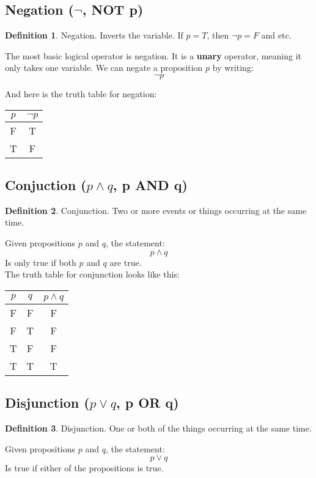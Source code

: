 \documentclass{article}
\theoremstyle{definition}
\newtheorem{df}{Definition}[section]
\begin{document}
  \subsection{Negation ($\neg$, NOT p)}
  \begin{df}{Negation.}
    Inverts the variable. If $p=T$, then $\neg p=F$ and etc.
  \end{df}

  The most basic logical operator is negation. It is a \textbf{unary} operator, meaning it only takes one variable. We can negate a proposition $p$ by writing:
  \[\neg p\]

  And here is the truth table for negation:

  \begin{table}[H]
    \centering
    \begin{tabular}{c|c}
      $p$ & $\neg p$ \\
      \hline
      F & T \\
      T & F \\
    \end{tabular}
    
  \end{table}

  \subsection{Conjuction ($p \wedge q$, p AND q)}
  \begin{df}{Conjunction.}
    Two or more events or things occurring at the same time.
  \end{df}
  Given propositions $p$ and $q$, the statement:
  \[ p \wedge q \]
  Is only true if both $p$ and $q$ are true. \\
  The truth table for conjunction looks like this:

  \begin{table}[H]
    \centering
    \begin{tabular}{c|c|c}
      $p$ & $q$ & $p \wedge q$ \\
      \hline
      F & F & F \\
      F & T & F \\
      T & F & F \\
      T & T & T \\
    \end{tabular}
  \end{table}

  \subsection{Disjunction ($p \lor q$, p OR q)}
  \begin{df}{Disjunction.}
    One or both of the things occurring at the same time.
  \end{df}
  Given propositions $p$ and $q$, the statement:
  \[p \lor q\]
  Is true if either of the propositions is true.\\
\end{document}
